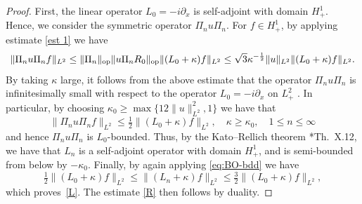 \documentclass [11pt] {article}
\newcommand{\<}{\langle}
\renewcommand{\>}{\rangle}
\newcommand{\op}{\textup{op}}
\begin{document}
\begin{proof}  First, the linear operator $L_0 = -i\partial_x$ is self-adjoint with domain $H^1_{+}$. Hence, we consider the  symmetric operator $\Pi_n u \Pi_n $.
For $f\in H^1_+$, by applying estimate \eqref{est 1} we have
\begin{equation}
\| \Pi_nu\Pi_n f \|_{L^2}
\le \| \Pi_n\|_\op \| u\Pi_n R_0\|_\op \| (L_0+\kappa)f \|_{L^2} 
\le \sqrt3 \kappa^{-\frac12} \|u\|_{L^2} \| (L_0+\kappa)f \|_{L^2}.
\label{est 1p2}
\end{equation}
By taking $\kappa$ large, it follows from the above estimate that the operator $\Pi_nu\Pi_n$ is infinitesimally small with respect to the operator $L_0 = -i\partial_x$ on $L^2_+$ \cite[Chp.~X.2]{ReedSimonvol2}.  
In particular, by choosing $\kappa_0 \ge \max{\{12\| u\|_{L^2}^2,1\}}$ we have that
\begin{equation}\label{eq:BO-bdd}
\| \Pi_nu\Pi_n f \|_{L^2}
\leq \tfrac{1}{2} \| (L_0+\kappa)f\|_{L^2}, \quad \kappa \ge \kappa_0, \quad 1\leq n\leq \infty
\end{equation}
and hence $\Pi_nu\Pi_n$ is $L_0$-bounded.
Thus, by the Kato--Rellich theorem \cite{ReedSimonvol2}*{Th.~X.12}, we have that $L_n$ is a self-adjoint operator with domain $H^1_+$, and is semi-bounded from below by $-\kappa_0$. 
Finally, by again applying \eqref{eq:BO-bdd} we have
\begin{equation*}
\tfrac{1}{2} \| (L_0+\kappa)f\|_{L^2}
\leq \| (L_n+\kappa)f\|_{L^2}
\leq \tfrac{3}{2} \| (L_0+\kappa)f\|_{L^2} ,
\end{equation*}
which proves~\eqref{L}.  The estimate \eqref{R} then follows by duality.
\end{proof}
\end{document}
